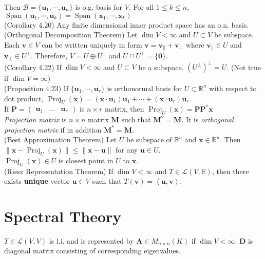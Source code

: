 \documentclass{article}
\theoremstyle{definition}
\DeclareMathOperator{\Span}{Span}
\DeclareMathOperator{\Proj}{Proj}
\begin{document}
Then $\mathcal{B}=\{\mathbf{u}_{1},\cdots,\mathbf{u}_{n}\}$ is o.g. basis for $V$. For all $1\leq k\leq n$, $\Span(\mathbf{u}_{1},\cdots,\mathbf{u}_{k})=\Span(\mathbf{x}_{1},\cdots,\mathbf{x}_{k})$\\
(Corollary 4.20) Any finite dimensional inner product space has an o.n. basis.\\
(Orthogonal Decomposition Theorem) Let $\dim V<\infty$ and $U\subset V$ be subspace.\\
Each $\mathbf{v}\in V$ can be written uniquely in form $\mathbf{v}=\mathbf{v}_{||}+\mathbf{v}_{\perp}$ where $\mathbf{v}_{||}\in U$ and $\mathbf{v}_{\perp}\in U^{\perp}$. Therefore, $V=U\oplus U^{\perp}$ and $U\cap U^{\perp}=\{\mathbf{0}\}$.\\
(Corollary 4.22) If $\dim V<\infty$ and $U\subset V$ be a subspace. $(U^{\perp})^{\perp}=U$. (Not true if $\dim V=\infty$)\\
(Proposition 4.23) If $\{\mathbf{u}_{1},\cdots,\mathbf{u}_{r}\}$ is orthonormal basis for $U\subset\mathbb{R}^{n}$ with respect to dot product, $\Proj_{U}(\mathbf{x})=(\mathbf{x}\cdot\mathbf{u}_{1})\mathbf{u}_{1}+\cdots+(\mathbf{x}\cdot\mathbf{u}_{r})\mathbf{u}_{r}$.\\
If $\mathbf{P}=\begin{pmatrix}
    \mathbf{u}_{1} & \hdots & \mathbf{u}_{r}
\end{pmatrix}$ is $n\times r$ matrix, then $\Proj_{U}(\mathbf{x})=\mathbf{PP}^{*}\mathbf{x}$\\
\textit{Projection matrix} is $n\times n$ matrix $\mathbf{M}$ such that $\mathbf{M}^{2}=\mathbf{M}$. It is \textit{orthogonal projection matrix} if in addition $\mathbf{M}^{*}=\mathbf{M}$.\\
(Best Approximation Theorem) Let $U$ be subspace of $\mathbb{R}^{n}$ and $\mathbf{x}\in\mathbb{R}^{n}$. Then $\lVert\mathbf{x}-\Proj_{U}(\mathbf{x})\rVert\leq\lVert\mathbf{x}-\mathbf{u}\rVert$ for any $\mathbf{u}\in U$.\\
$\Proj_{U}(\mathbf{x})\in U$ is closest point in $U$ to $\mathbf{x}$.\\
(Riesz Representation Theorem) If $\dim V<\infty$ and $T\in\mathscr{L}(V,\mathbb{R})$, then there exists \textbf{unique} vector $\mathbf{u}\in V$ such that $T(\mathbf{v})=\left<\mathbf{u},\mathbf{v}\right>$.
\newpage
\section{Spectral Theory}
$T\in\mathscr{L}(V,V)$ is l.i. and is represented by $\mathbf{A}\in M_{n\times n}(K)$ if $\dim{V}<\infty$. $\mathbf{D}$ is diagonal matrix consisting of corresponding eigenvalues.\\
\end{document}

